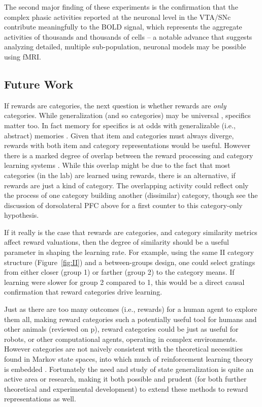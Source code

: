 The second major finding of these experiments is the confirmation that the complex phasic activities reported at the neuronal level in the VTA/SNc \citep{Kim:2006p1063, Matsumoto:2009p7219,Smith:2011p9101} contribute meaningfully to the BOLD signal, which represents the aggregate activities of thousands and thousands of cells -- a notable advance that suggests analyzing detailed, multiple sub-population, neuronal models may be possible using fMRI.

\subsection{Future Work}
\label{sub:future}
If rewards are categories, the next question is whether rewards are \emph{only} categories.  While generalization (and so categories) may be universal \citep{Shepard:1987p9102}, specifics matter too.  In fact memory for specifics is at odds with generalizable (i.e., abstract) memories \citep{Atallah:2004p5466}. Given that item and categories must always diverge, rewards with both item and category representations would be useful.  However there is a marked degree of overlap between the reward processing and category learning systems \citep{Seger:2010p7189,Ashby:2011p9148}.  While this overlap might be due to the fact that most categories (in the lab) are learned using rewards, there is an alternative, if rewards are just a kind of category.  The overlapping activity could reflect only the process of one category building another (dissimilar) category, though see the discussion of dorsolateral PFC above for a first counter to this category-only hypothesis.

If it really is the case that rewards are categories, and category similarity metrics affect reward valuations, then the degree of similarity should be a useful parameter in shaping the learning rate.  For example, using the same II category structure (Figure~\ref{fig:II}) and a between-groups design, one could select gratings from either closer (group 1) or farther (group 2) to the category means. If learning were slower for group 2 compared to 1, this would be a direct causal confirmation that reward categories drive learning. 

Just as there are too many outcomes (i.e., rewards) for a human agent to explore them all, making reward categories such a potentially useful tool for humans and other animals (reviewed on p\pageref{sub:gen}), reward categories could be just as useful for robots, or other computational agents, operating in complex environments.   However categories are not naively consistent with the theoretical necessities found in Markov state spaces, into which much of reinforcement learning theory is embedded \citep{Sutton:1998p9247}.  Fortunately the need and study of state generalization is quite an active area or research, making it both possible and prudent (for both further theoretical and experimental development) to extend these methods to reward representations as well. 
\clearpage